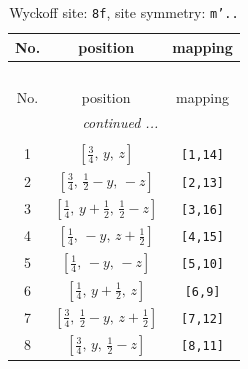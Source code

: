 \documentclass[fleqn,8pt]{jsarticle}
\begin{document}
\begin{longtable}{ccc}
\caption{Wyckoff site: {\tt 8f}, site symmetry: {\tt m'..}}
 \\
 \hline \hline
No. & position & mapping \\ \hline \endfirsthead

\multicolumn{2}{l}{\tablename\ \thetable{}} \\
 \hline \hline
No. & position & mapping \\ \hline \endhead

 \hline \hline
\multicolumn{2}{r}{\footnotesize\it continued ...} \\ \endfoot

 \hline \hline
\multicolumn{2}{r}{} \\ \endlastfoot

1 & $\left[ \frac{3}{4},\, y,\, z \right]$ & {\tt [1,14]} \\ \hline
2 & $\left[ \frac{3}{4},\, \frac{1}{2} - y,\, - z \right]$ & {\tt [2,13]} \\ \hline
3 & $\left[ \frac{1}{4},\, y + \frac{1}{2},\, \frac{1}{2} - z \right]$ & {\tt [3,16]} \\ \hline
4 & $\left[ \frac{1}{4},\, - y,\, z + \frac{1}{2} \right]$ & {\tt [4,15]} \\ \hline
5 & $\left[ \frac{1}{4},\, - y,\, - z \right]$ & {\tt [5,10]} \\ \hline
6 & $\left[ \frac{1}{4},\, y + \frac{1}{2},\, z \right]$ & {\tt [6,9]} \\ \hline
7 & $\left[ \frac{3}{4},\, \frac{1}{2} - y,\, z + \frac{1}{2} \right]$ & {\tt [7,12]} \\ \hline
8 & $\left[ \frac{3}{4},\, y,\, \frac{1}{2} - z \right]$ & {\tt [8,11]} \\
\end{longtable}
\renewcommand{\arraystretch}{1.2}
\end{document}
